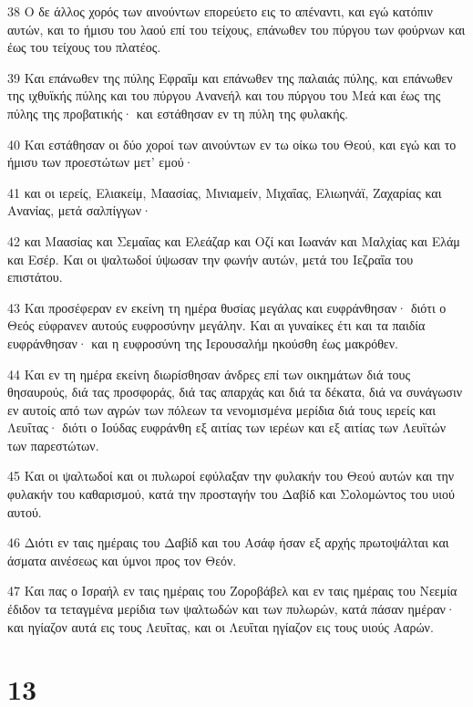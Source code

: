 \par 38 Ο δε άλλος χορός των αινούντων επορεύετο εις το απέναντι, και εγώ κατόπιν αυτών, και το ήμισυ του λαού επί του τείχους, επάνωθεν του πύργου των φούρνων και έως του τείχους του πλατέος.
\par 39 Και επάνωθεν της πύλης Εφραΐμ και επάνωθεν της παλαιάς πύλης, και επάνωθεν της ιχθυϊκής πύλης και του πύργου Ανανεήλ και του πύργου του Μεά και έως της πύλης της προβατικής· και εστάθησαν εν τη πύλη της φυλακής.
\par 40 Και εστάθησαν οι δύο χοροί των αινούντων εν τω οίκω του Θεού, και εγώ και το ήμισυ των προεστώτων μετ' εμού·
\par 41 και οι ιερείς, Ελιακείμ, Μαασίας, Μινιαμείν, Μιχαΐας, Ελιωηνάϊ, Ζαχαρίας και Ανανίας, μετά σαλπίγγων·
\par 42 και Μαασίας και Σεμαΐας και Ελεάζαρ και Οζί και Ιωανάν και Μαλχίας και Ελάμ και Εσέρ. Και οι ψαλτωδοί ύψωσαν την φωνήν αυτών, μετά του Ιεζραΐα του επιστάτου.
\par 43 Και προσέφεραν εν εκείνη τη ημέρα θυσίας μεγάλας και ευφράνθησαν· διότι ο Θεός εύφρανεν αυτούς ευφροσύνην μεγάλην. Και αι γυναίκες έτι και τα παιδία ευφράνθησαν· και η ευφροσύνη της Ιερουσαλήμ ηκούσθη έως μακρόθεν.
\par 44 Και εν τη ημέρα εκείνη διωρίσθησαν άνδρες επί των οικημάτων διά τους θησαυρούς, διά τας προσφοράς, διά τας απαρχάς και διά τα δέκατα, διά να συνάγωσιν εν αυτοίς από των αγρών των πόλεων τα νενομισμένα μερίδια διά τους ιερείς και Λευΐτας· διότι ο Ιούδας ευφράνθη εξ αιτίας των ιερέων και εξ αιτίας των Λευϊτών των παρεστώτων.
\par 45 Και οι ψαλτωδοί και οι πυλωροί εφύλαξαν την φυλακήν του Θεού αυτών και την φυλακήν του καθαρισμού, κατά την προσταγήν του Δαβίδ και Σολομώντος του υιού αυτού.
\par 46 Διότι εν ταις ημέραις του Δαβίδ και του Ασάφ ήσαν εξ αρχής πρωτοψάλται και άσματα αινέσεως και ύμνοι προς τον Θεόν.
\par 47 Και πας ο Ισραήλ εν ταις ημέραις του Ζοροβάβελ και εν ταις ημέραις του Νεεμία έδιδον τα τεταγμένα μερίδια των ψαλτωδών και των πυλωρών, κατά πάσαν ημέραν· και ηγίαζον αυτά εις τους Λευΐτας, και οι Λευΐται ηγίαζον εις τους υιούς Ααρών.

\chapter{13}

